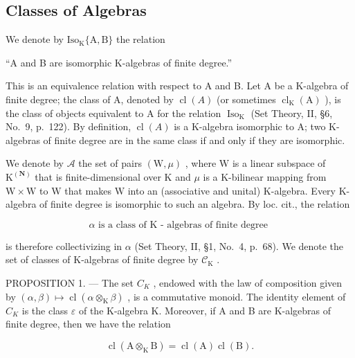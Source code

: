 \subsection{Classes of Algebras}

We denote by \(\mathrm{Iso}_{\mathrm{K}}\{\mathrm{A},\mathrm{B}\}\) the relation

``A and B are isomorphic K-algebras of finite degree.''

This is an equivalence relation with respect to A and B. Let A be a K-algebra of finite degree; the class of A, denoted by \(\operatorname{cl}(A)\) (or sometimes \(\operatorname{cl}_{\mathrm{K}}(\mathrm{A})\) ), is the class of objects equivalent to A for the relation \(\operatorname{Iso}_{\mathrm{K}}\) (Set Theory, II, §6, No.~9, p.~122). By definition, \(\operatorname{cl}(A)\) is a K-algebra isomorphic to A; two K-algebras of finite degree are in the same class if and only if they are isomorphic.

We denote by \(\mathcal{A}\) the set of pairs \((\mathrm{W},\mu)\) , where \(\mathrm{W}\) is a linear subspace of \(\mathrm{K}^{(\mathbf{N})}\) that is finite-dimensional over \(\mathrm{K}\) and \(\mu\) is a K-bilinear mapping from \(\mathrm{W} \times \mathrm{W}\) to \(\mathrm{W}\) that makes \(\mathrm{W}\) into an (associative and unital) K-algebra. Every K-algebra of finite degree is isomorphic to such an algebra. By loc. cit., the relation

\[
\alpha \text {   is   a   class   of   K - algebras   of   finite   degree }
\]

is therefore collectivizing in \(\alpha\) (Set Theory, II, §1, No.~4, p.~68). We denote the set of classes of K-algebras of finite degree by \(\mathcal{C}_{\mathrm{K}}\) .

PROPOSITION 1. --- The set \(C_{K}\) , endowed with the law of composition given by \((\alpha, \beta) \mapsto \operatorname{cl}(\alpha \otimes_{\mathrm{K}} \beta)\) , is a commutative monoid. The identity element of \(C_{K}\) is the class \(\varepsilon\) of the K-algebra K. Moreover, if A and B are K-algebras of finite degree, then we have the relation

\[
\operatorname{cl} (\mathrm{A} \otimes_ {\mathrm{K}} \mathrm{B}) = \operatorname{cl} (\mathrm{A}) \operatorname{cl} (\mathrm{B}).\tag{1}
\]

